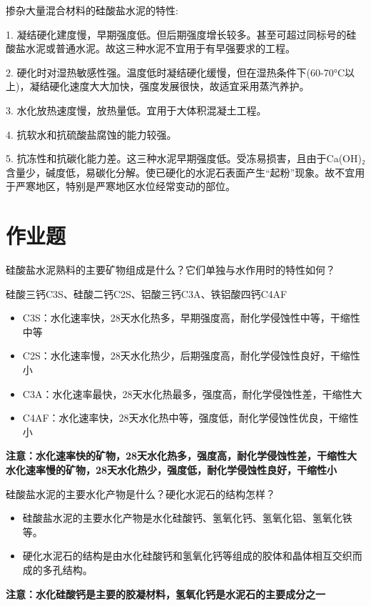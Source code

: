 \documentclass[12pt, a4paper, oneside, UTF8]{ctexbook}
\begin{document}
\begin{remark}
掺杂大量混合材料的硅酸盐水泥的特性:

1. 凝结硬化建度慢，{\color{red}早期强度低。但后期强度增长较多。}甚至可超过同标号的硅酸盐水泥或普通水泥。故这三种水泥不宜用于有早强要求的工程。

2. {\color{red}硬化时对湿热敏感性强。温度低时凝结硬化缓慢}，但在湿热条件下(60-70°C以上)，凝结硬化速度大大加快，强度发展很快，故适宜采用蒸汽养护。

3. {\color{red}水化放热速度慢，放热量低}。宜用于大体积混凝土工程。

4. {\color{red}抗软水和抗硫酸盐腐蚀的能力较强}。

5. {\color{red}抗冻性和抗碳化能力差}。这三种水泥早期强度低。受冻易损害，且由于Ca(OH)₂含量少，碱度低，易碳化分解。使已硬化的水泥石表面产生“起粉”现象。故不宜用于严寒地区，特别是严寒地区水位经常变动的部位。
\end{remark}

\section*{作业题}

\begin{example}
	硅酸盐水泥熟料的主要矿物组成是什么？它们单独与水作用时的特性如何？ 

	硅酸三钙C3S、硅酸二钙C2S、铝酸三钙C3A、铁铝酸四钙C4AF

	\begin{itemize}
		\item C3S：水化速率快，28天水化热多，早期强度高，耐化学侵蚀性中等，干缩性中等
		\item C2S：水化速率慢，28天水化热少，后期强度高，耐化学侵蚀性良好，干缩性小
		\item C3A：水化速率最快，28天水化热最多，强度高，耐化学侵蚀性差，干缩性大
		\item C4AF：水化速率快，28天水化热中等，强度低，耐化学侵蚀性优良，干缩性小
	\end{itemize}
	\textbf{注意：水化速率快的矿物，28天水化热多，强度高，耐化学侵蚀性差，干缩性大}
	\textbf{水化速率慢的矿物，28天水化热少，强度低，耐化学侵蚀性良好，干缩性小}
\end{example}

\begin{example}
	硅酸盐水泥的主要水化产物是什么？硬化水泥石的结构怎样？ 

	\begin{itemize}
		\item 硅酸盐水泥的主要水化产物是水化硅酸钙、氢氧化钙、氢氧化铝、氢氧化铁等。
		\item 硬化水泥石的结构是由水化硅酸钙和氢氧化钙等组成的胶体和晶体相互交织而成的多孔结构。
	\end{itemize}
	\textbf{注意：水化硅酸钙是主要的胶凝材料，氢氧化钙是水泥石的主要成分之一}
\end{example}
\end{document}
